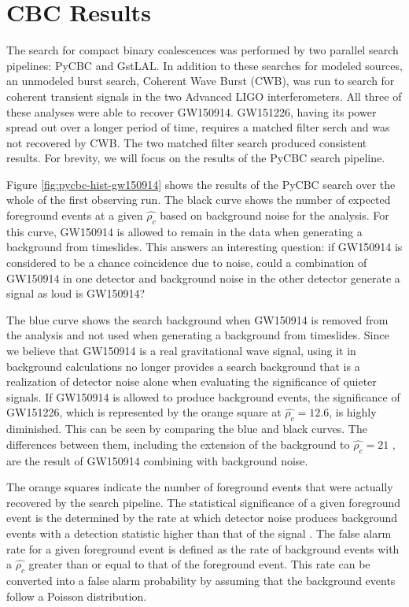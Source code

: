\section{CBC Results}

The search for compact binary
coalescences was performed by two parallel search pipelines: PyCBC and 
GstLAL. In addition to these searches for modeled sources, an unmodeled 
burst search, Coherent Wave Burst (CWB), was run to search for coherent 
transient signals in the two Advanced LIGO interferometers. 
All three of these analyses were able to recover GW150914. GW151226, 
having its power spread out over a longer period of time, requires a 
matched filter serch and was not recovered by CWB. The two matched filter 
search produced consistent results. 
For brevity, we will focus on the results of the PyCBC search pipeline.

Figure \ref{fig:pycbc-hist-gw150914} shows the results of the PyCBC search 
over the whole of the first observing run. The black curve shows the 
number of expected foreground events at a given $\hat{\rho_c}$ based on 
background noise for the analysis. For this curve, GW150914 is 
allowed to remain in the data when generating a background from timeslides. 
This answers an interesting question: if GW150914 is considered to be a 
chance coincidence due to noise, could a combination of GW150914 in 
one detector and background noise in the other detector generate a 
signal as loud is GW150914?

The blue curve shows the search background when GW150914 is removed 
from the analysis and not used when generating a background from 
timeslides. Since we believe that GW150914 is a real gravitational wave 
signal, using it in background calculations no longer provides a 
search background that is a realization of detector noise alone 
when evaluating the significance of quieter signals. 
If GW150914 is allowed to produce background events, the 
significance of GW151226, which is represented by the orange square at 
$\hat{\rho_c} = 12.6$, is highly diminished. This can be seen by comparing 
the blue and black curves. The differences between them, including the 
extension of the background to $\hat{\rho_c} = 21$ , are the result 
of GW150914 combining with background noise.

The orange squares indicate the 
number of foreground events that were actually recovered by the search 
pipeline. 
The statistical significance of a given foreground event is 
the determined by the rate at which detector noise produces background 
events with a detection statistic higher than that of the signal 
\cite{GW150914-CBC}. The false alarm rate for a given foreground 
event is defined as the rate of background events with a $\hat{\rho_c}$ 
greater than or equal to that of the foreground event. This rate 
can be converted into a false alarm probability by assuming that the 
background events follow a Poisson distribution. 

